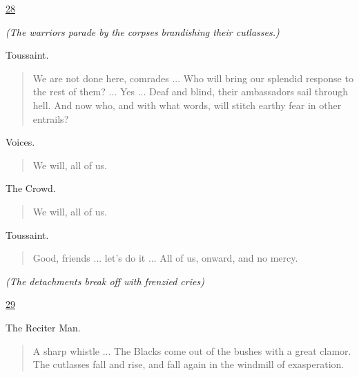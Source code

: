 \documentclass[letterpaper,article,12pt,oneside,notitlepage]{memoir}
\begin{document}
\clearpage

\href{http://cesaire.elotroalex.com/chiens/chiens/p028.html}{28}

\textit{(The warriors parade by the corpses brandishing their cutlasses.)}

\begin{center}Toussaint.\end{center}

\begin{verse}
\indent We are not done here, comrades ... Who will bring our splendid response to the rest of them? ... Yes ... Deaf and blind, their ambassadors sail through hell. And now who, and with what words, will stitch earthy fear in other entrails? \\
\end{verse}

\begin{center}Voices.\end{center}

\begin{verse}
\hspace{1cm} We will, all of us. \\
\end{verse}

\begin{center}The Crowd.\end{center}

\begin{verse}
\hspace{1cm} We will, all of us. \\
\end{verse}

\begin{center}Toussaint.\end{center}

\begin{verse}
Good, friends ... let's do it ... All of us, onward, and no mercy. \\
\end{verse}

\textit{(The detachments break off with frenzied cries)}

\clearpage

\href{http://cesaire.elotroalex.com/chiens/chiens/p029.html}{29}

\begin{center}The Reciter Man.\end{center}

\begin{verse}
\indent A sharp whistle ... The Blacks come out of the bushes with a great clamor. The cutlasses fall and rise, and fall again in the windmill of exasperation. \\
\end{verse}
\end{document}
